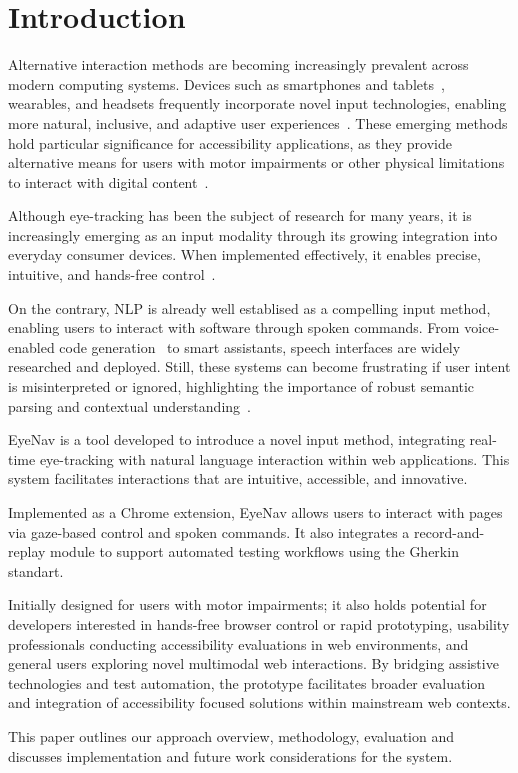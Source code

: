 
\section{Introduction}

Alternative interaction methods are becoming increasingly prevalent across modern computing systems. 
Devices such as smartphones and tablets~\cite{apple2024accessibility, honor_magic6pro_specs}, wearables\cite{tobii_glasses_x}, and headsets\cite{apple_vision_pro_2025,playstation_vr2_specs,vive_pro2_2025} frequently incorporate novel input technologies, enabling more natural, inclusive, and adaptive user experiences~\cite{dondi2023gazehci, fernandes2023eyevr}.
These emerging methods hold particular significance for accessibility applications, as they provide alternative means for users with motor impairments or other physical limitations to interact with digital content~\cite{hsieh2024increasing}.

Although eye-tracking has been the subject of research for many years\cite{gips1996eagleeyes}, it is increasingly emerging as an input modality through its growing integration into everyday consumer devices. When implemented effectively, it enables precise, intuitive, and hands-free control~\cite{huang2024visionpro}.

On the contrary, \ac{NLP} is already well establised as a compelling input method, enabling users to interact with software through spoken commands. 
From voice-enabled code generation~\cite{serenade2025} to smart assistants, speech interfaces are widely researched and deployed. Still, these systems can become frustrating if user intent is misinterpreted or ignored, highlighting the importance of robust semantic parsing and contextual understanding~\cite{mozafari2020chatbot, liu2024chatgpt}. 

EyeNav is a tool developed to introduce a novel input method, integrating real-time eye-tracking with natural language interaction within web applications. This system facilitates interactions that are intuitive, accessible, and innovative.

Implemented as a Chrome extension, EyeNav allows users to interact with pages via gaze-based control and spoken commands. It also integrates a record-and-replay module to support automated testing workflows using the Gherkin standart.

Initially designed for users with motor impairments; it also holds potential for developers interested in hands-free browser control or rapid prototyping, usability professionals conducting accessibility evaluations in web environments, and general users exploring novel multimodal web interactions. By bridging assistive technologies and test automation, the prototype facilitates broader evaluation and integration of accessibility focused solutions within mainstream web contexts.

This paper outlines our approach overview, methodology, evaluation and discusses implementation and future work considerations for the system.
